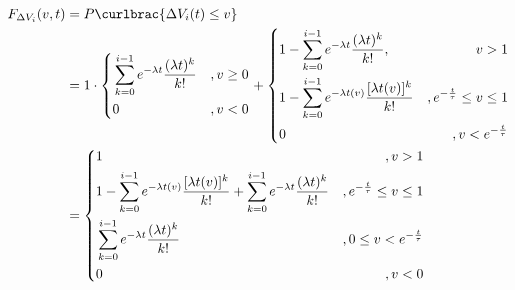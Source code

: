 \documentclass[11pt]{article}
\begin{document}
\begin{align}
  \begin{aligned}
    F_{\Delta V_i}(v,t) & =P\curlbrac{\Delta V_i(t)\le v}                                                                                                                                                                       \\
                         & =1\cdot\left\{
                          \begin{aligned}
                            & \sum_{k=0}^{i-1}e^{-\lambda t}\frac{(\lambda t)^k}{k!} & ,v\ge 0         \\
                                                                                    & 0       & ,v< 0
                           \end{aligned}\right.+\left\{\begin{aligned}
                                                          & 1-\sum_{k=0}^{i-1}e^{-\lambda t}\frac{(\lambda t)^k}{k!},      & v>1                    \\
                                                          & 1-\sum_{k=0}^{i-1}e^{-\lambda t(v)}\frac{[\lambda t(v)]^k}{k!}
                                                          & ,e^{-\frac{t}{\tau}}\le v\le 1                                                          \\
                                                          & 0                                                              & ,v<e^{-\frac{t}{\tau}}
                                                       \end{aligned} \right.                                                        \\
                         & =\left\{\begin{aligned}
                                      & 1                                                                                                                     & ,v>1                              \\
                                      & 1-\sum_{k=0}^{i-1}e^{-\lambda t(v)}\frac{[\lambda t(v)]^k}{k!}+\sum_{k=0}^{i-1}e^{-\lambda t}\frac{(\lambda t)^k}{k!} & , e^{-\frac{t}{\tau}} \le v \le 1 \\
                                      & \sum_{k=0}^{i-1}e^{-\lambda t}\frac{(\lambda t)^k}{k!}                                                                & ,0\le v<e^{-\frac{t}{\tau}}       \\
                                      & 0                                                                                                                     & ,v<0
                                   \end{aligned}\right.
  \end{aligned}
\end{align}\par
\end{document}
